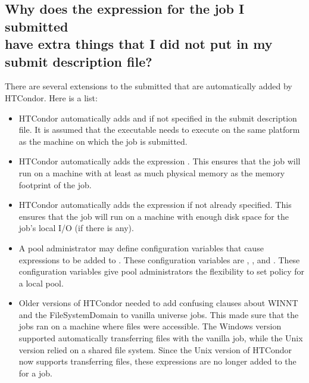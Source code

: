 \subsection*{Why does the  expression for the job I submitted\\
have extra things that I did not put in my submit description file?}
There are several extensions to the submitted 
that are automatically added by HTCondor.
Here is a list:
\begin{itemize}
  \item HTCondor automatically adds  and  if 
  not specified in the submit description file. It is assumed that
  the executable needs to execute on the same platform as the machine
  on which the job is submitted.

  \item HTCondor automatically adds the expression
  .
  This ensures that the job will run on a machine with at
  least as much physical memory as the memory footprint of the job.

  \item HTCondor automatically adds the expression
   if not already specified.
  This ensures that the job will run on a machine with enough disk
  space for the job's local I/O (if there is any).

  \item A pool administrator may define configuration variables that
  cause expressions to be added to .
  These configuration variables are ,
  , and .
  These configuration variables give
  pool administrators the flexibility to set policy for a local pool.

  \item Older versions of HTCondor needed to add confusing clauses
  about WINNT and the FileSystemDomain to vanilla universe jobs.
  This made sure that the jobs ran on a machine where files were
  accessible.
  The Windows version supported automatically transferring files
  with the vanilla job,
  while the Unix version relied on a shared file system.
  Since the Unix version of HTCondor now supports transferring files,
  these expressions are no longer added to the
   for a job.
\end{itemize}


